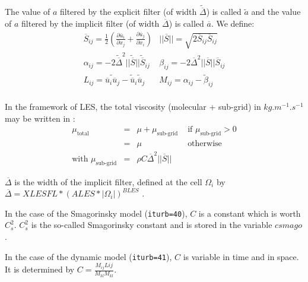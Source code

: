 {{{The value of $a$ filtered by the explicit filter (of width
$\widetilde{\overline{\Delta}}$) is called $\widetilde{a}$ and the value
of $a$ filtered by the implicit filter (of width $\overline{\Delta}$) is
called $\overline{a}$.
We define:
\begin{equation}
\begin{array}{ll}
\overline{S}_{ij}=\frac{1}{2}(\frac{\partial \overline{u}_i}{\partial x_j}
                  +\frac{\partial \overline{u}_j}{\partial x_i})  &
||\overline{S}||=\sqrt{2 \overline{S}_{ij}\overline{S}_{ij}}\\
\alpha_{ij}=-2\widetilde{\overline{\Delta}}^2
             ||\widetilde{\overline{S}}||
             \widetilde{\overline{S}}_{ij}&
\beta_{ij}=-2\overline{\Delta}^2
             ||\overline{S}||
               \overline{S}_{ij}\\
L_{ij}=\widetilde{\overline{u}_i\overline{u}_j}-
 \widetilde{\overline{u}}_i\widetilde{\overline{u}}_j&
M_{ij}=\alpha_{ij}-\widetilde{\beta}_{ij}\\
\end{array}
\end{equation}


In the framework of LES, the total viscosity (molecular + sub-grid) in
$kg.m^{-1}.s^{-1}$ may be written in \CS:
\begin{equation}
\begin{array}{llll}
\mu_{\text{total}}&=&\mu+\mu_{\text{sub-grid}} &
    \text{\ \ if\ \ }\mu_{\text{sub-grid}}>0\\
                   &=&\mu                          &
    \text{\ \ otherwise }\\
\text{with\ }\mu_{\text{sub-grid}}&=&\rho C \overline{\Delta}^2 ||\overline{S}||
\end{array}
\end{equation}

$\overline{\Delta}$ is the width of the implicit filter, defined at the
cell $\Omega_i$ by \\
$\overline{\Delta}=XLESFL*(ALES*|\Omega_i|)^{BLES}$
.

In the case of the Smagorinsky model (\texttt{iturb=40}), $C$ is a
constant which is worth $C_s^2$. $C_s^2$ is the so-called Smagorinsky
constant and is stored in the variable \texttt{$csmago$}.

In the case of the dynamic model (\texttt{iturb=41}), $C$ is variable in
time and in space. It is determined by
$\displaystyle C=\frac{M_{ij}L{ij}}{M_{kl}M_{kl}}$.

}}}
